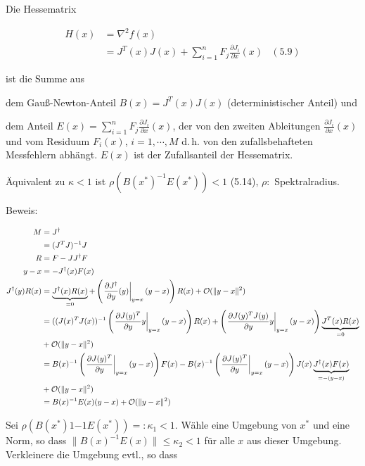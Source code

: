 Die Hessematrix

\begin{align*}
H(x) &= \nabla^2 f(x) \\
&= J^T(x) J(x) + \sum\limits_{i=1}^n F_j \frac{\partial J_i}{\partial x} (x) & (5.9)
\end{align*}

ist die Summe aus

\bitm
\item dem Gauß-Newton-Anteil $B(x) = J^T(x) J(x)$ (deterministischer Anteil) und
\item dem Anteil $E(x) = \sum_{i=1}^n F_j \frac{\partial J_i}{\partial x} (x)$, der von den zweiten Ableitungen $\frac{\partial J_i}{\partial x} (x)$ und vom Residuum $F_i(x)$, $i=1,\cdots,M$ d.\,h. von den zufallsbehafteten Messfehlern abhängt. $E(x)$ ist der Zufallsanteil der Hessematrix.
\eitm


Äquivalent zu $\kappa < 1$ ist $\rho (B(x^*)^{-1} E(x^*)) < 1$ (5.14), $\rho: $ Spektralradius.

Beweis:

\begin{align*}
M &= J^\dagger \\
&= (J^T J)^{-1} J \\
R &= F - J J^\dagger F \\
y-x &= - J^\dagger(x) F(x) \\
J^\dagger(y) R(x) &= \underbrace{J^\dagger(x) R(x)}_{=0} + \left( \left. \frac{\partial J^\dagger}{\partial y} (y)\right|_{y=x} (y-x) \right) R(x) + \mathcal O(\|y-x\|^2) \\
&= ((J(x)^T J(x))^{-1} \left( \left. \frac{\partial J(y)^T}{\partial y} y\right|_{y=x} (y-x) \right) R(x) + \left( \left. \frac{\partial J(y)^T J(y)}{\partial y} y\right|_{y=x} (y-x) \right) \underbrace{J^T(x) R(x)}_{=0} \\ &+ \mathcal O(\|y-x\|^2) \\
&= B(x)^{-1} \left( \left. \frac{\partial J(y)^T}{\partial y} \right|_{y=x} (y-x) \right) F(x) - B(x)^{-1} \left( \left. \frac{\partial J(y)^T}{\partial y} \right|_{y=x} (y-x) \right)J(x) \underbrace{J^\dagger(x) F(x)}_{=-(y-x)} \\ &+ \mathcal O(\|y-x\|^2) \\
&= B(x)^{-1} E(x) (y-x) + \mathcal O(\|y-x\|^2) \\
\end{align*}

Sei $\rho(B(x^*)1{-1} E(x^*)) =: \kappa_1 < 1$. Wähle eine Umgebung von $x^*$ und eine Norm, so dass $\| B(x)^{-1} E(x) \| \leq \kappa_2 < 1$ für alle $x$ aus dieser Umgebung. Verkleinere die Umgebung evtl., so dass 

